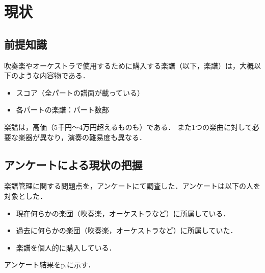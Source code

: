 \chapter{現状}
\section{前提知識}
吹奏楽やオーケストラで使用するために購入する楽譜（以下，楽譜）は，大概以下のような内容物である．
\begin{itemize}
    \item スコア（全パートの譜面が載っている）
    \item 各パートの楽譜：パート数部
\end{itemize}
楽譜は，高価（5千円〜4万円超えるものも）である．
また1つの楽曲に対して必要な楽器が異なり，演奏の難易度も異なる．
\section{アンケートによる現状の把握}\label{chap:issues}
楽譜管理に関する問題点を，アンケートにて調査した．アンケートは以下の人を対象とした．
\begin{itemize}
    \item 現在何らかの楽団（吹奏楽，オーケストラなど）に所属している．
    \item 過去に何らかの楽団（吹奏楽，オーケストラなど）に所属していた．
    \item 楽譜を個人的に購入している．
\end{itemize}
アンケート結果をp.\pageref{frame:アンケート}に示す．
\clearpage
